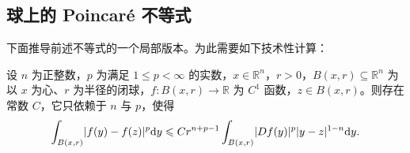 \documentclass[../../main.tex]{subfiles}%
\begin{document}
\subsection{球上的 Poincaré 不等式}\label{subsection:ch04-05-2}

下面推导前述不等式的一个局部版本。为此需要如下技术性计算：

\begin{lemma}\label{lemma:ch04-4-1}
设 $n$ 为正整数，$p$ 为满足 $1\leqslant p<\infty$ 的实数，$x\in\mathbb{R}^n$，$r>0$，$B(x,r)\subseteq\mathbb{R}^n$ 为以 $x$ 为心、$r$ 为半径的闭球，$f:B(x,r)\to\mathbb{R}$ 为 $C^1$ 函数，$z\in B(x,r)$。则存在常数 $C$，它只依赖于 $n$ 与 $p$，使得
\begin{align*}
\int_{B(x,r)}\lvert f(y)-f(z)\rvert^{p}\mathrm{d} y\leqslant C r^{n+p-1}\int_{B(x,r)}\lvert Df(y)\rvert^{p}\lvert y-z\rvert^{1-n}\mathrm{d} y .
\end{align*}
\end{lemma}
\end{document}
